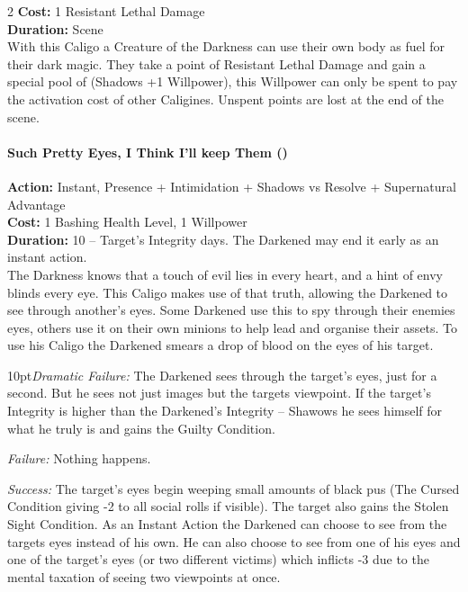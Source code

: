 \begin{multicols}{2}
\noindent \textbf{Cost:} 1 Resistant Lethal Damage\\

\noindent \textbf{Duration:} Scene\\

\noindent With this Caligo a Creature of the Darkness can use their own body as fuel for their dark magic. They take a point of Resistant Lethal Damage and gain a special pool of (Shadows +1 Willpower), this Willpower can only be spent to pay the activation cost of other Caligines. Unspent points are lost at the end of the scene. 

\paragraph*{Such Pretty Eyes, I Think I'll keep Them (\textbullet\textbullet\textbullet)}

\noindent \textbf{Action:} Instant, Presence + Intimidation + Shadows vs Resolve + Supernatural Advantage\\

\noindent \textbf{Cost:} 1 Bashing Health Level, 1 Willpower\\

\noindent \textbf{Duration:} 10 – Target's Integrity days. The Darkened may end it early as an instant action.\\

\noindent The Darkness knows that a touch of evil lies in every heart, and a hint of envy blinds every eye. This Caligo makes use of that truth, allowing the Darkened to see through another's eyes. Some Darkened use this to spy through their enemies eyes, others use it on their own minions to help lead and organise their assets. To use his Caligo the Darkened smears a drop of blood on the eyes of his target.

    \begin{myindentpar}{10pt}\emph{Dramatic Failure:} The Darkened sees through the target's eyes, just for a second. But he sees not just images but the targets viewpoint. If the target's Integrity is higher than the Darkened's Integrity – Shawows he sees himself for what he truly is and gains the Guilty Condition.
    
    \emph{Failure:} Nothing happens.
    
    \emph{Success:} The target's eyes begin weeping small amounts of black pus (The Cursed Condition giving -2 to all social rolls if visible). The target also gains the Stolen Sight Condition. As an Instant Action the Darkened can choose to see from the targets eyes instead of his own. He can also choose to see from one of his eyes and one of the target's eyes (or two different victims) which inflicts -3 due to the mental taxation of seeing two viewpoints at once.
    

\end{myindentpar}
\end{multicols}
